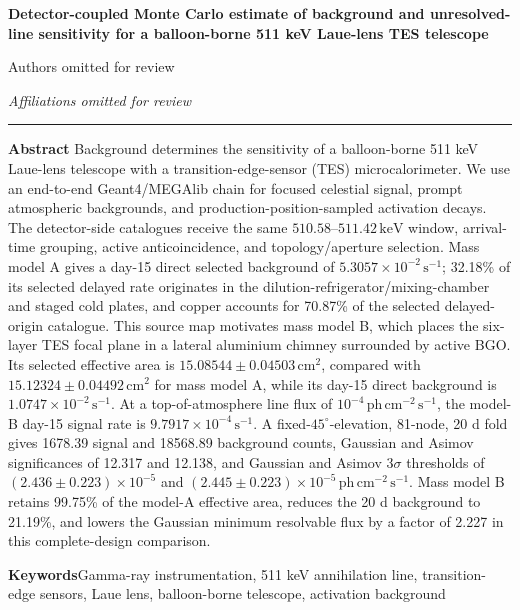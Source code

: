 \documentclass[11pt]{article}
\newcommand{\keV}{\ensuremath{\,\mathrm{keV}}}
\newcommand{\phcms}{\ensuremath{\,\mathrm{ph\,cm^{-2}\,s^{-1}}}}
\newcommand{\cps}{\ensuremath{\,\mathrm{s^{-1}}}}
\begin{document}
\thispagestyle{fancy}
\begin{flushleft}
{\LARGE\bfseries Detector-coupled Monte Carlo estimate of background and unresolved-line sensitivity for a balloon-borne 511 keV Laue-lens TES telescope\par}
\vspace{1.1em}
{\large Authors omitted for review\par}
\vspace{0.3em}
{\normalsize\itshape Affiliations omitted for review\par}
\end{flushleft}
\vspace{0.7em}
\noindent\rule{\textwidth}{0.4pt}
\vspace{0.5em}

\noindent\textbf{Abstract}\hspace{0.7em}
Background determines the sensitivity of a balloon-borne 511 keV Laue-lens
telescope with a transition-edge-sensor (TES) microcalorimeter. We use an
end-to-end Geant4/MEGAlib chain for focused celestial signal, prompt
atmospheric backgrounds, and production-position-sampled activation decays.
The detector-side catalogues receive the same $510.58$--$511.42\keV$ window,
arrival-time grouping, active anticoincidence, and topology/aperture selection.
Mass model A gives a day-15 direct selected background of
$5.3057\times10^{-2}\cps$; 32.18\% of its selected delayed rate originates in
the dilution-refrigerator/mixing-chamber and staged cold plates, and copper
accounts for 70.87\% of the selected delayed-origin catalogue. This source map
motivates mass model B, which places the six-layer TES focal plane in a lateral
aluminium chimney surrounded by active BGO. Its selected effective area is
$15.08544\pm0.04503\,\mathrm{cm^2}$, compared with
$15.12324\pm0.04492\,\mathrm{cm^2}$ for mass model A, while its day-15 direct
background is $1.0747\times10^{-2}\cps$. At a top-of-atmosphere line flux of
$10^{-4}\phcms$, the model-B day-15 signal rate is
$9.7917\times10^{-4}\cps$. A fixed-$45^\circ$-elevation, 81-node, 20 d fold
gives 1678.39 signal and 18568.89 background counts, Gaussian and Asimov
significances of 12.317 and 12.138, and Gaussian and Asimov $3\sigma$
thresholds of $(2.436\pm0.223)\times10^{-5}$ and
$(2.445\pm0.223)\times10^{-5}\phcms$. Mass model B retains 99.75\% of the
model-A effective area, reduces the 20 d background to 21.19\%, and lowers the
Gaussian minimum resolvable flux by a factor of 2.227 in this complete-design
comparison.

\vspace{0.7em}
\noindent\textbf{Keywords}\hspace{0.7em}Gamma-ray instrumentation, 511 keV annihilation line, transition-edge sensors, Laue lens, balloon-borne telescope, activation background
\end{document}
